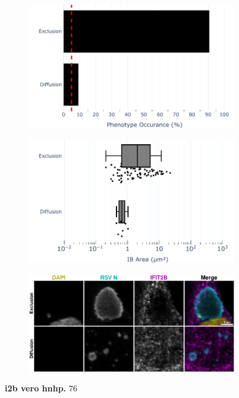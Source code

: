 \begin{figure}
    \begin{subfigure}{0.495\textwidth}
        \caption{}
        \includegraphics[width=1\linewidth]{10. Chapter 5/Figs/02. pIB/03. IFIT2B/04. bar_i2b_vero_hnhp.pdf} 
    \end{subfigure}
    \begin{subfigure}{0.495\textwidth}
        \caption{}
        \includegraphics[width=1\linewidth]{10. Chapter 5/Figs/02. pIB/03. IFIT2B/05. box_i2b_vero_hnhp.pdf}
    \end{subfigure}
    \begin{subfigure}{1\textwidth}
        \caption{}
        \includegraphics[width=1\linewidth]{10. Chapter 5/Figs/02. pIB/03. IFIT2B/06. i2b-vero-hnhp.pdf} 
    \end{subfigure}
    \caption[i2b vero hnhp]{\textbf{i2b vero hnhp.} 76}
    \label{fig:i2b vero hnhp}
\end{figure}

